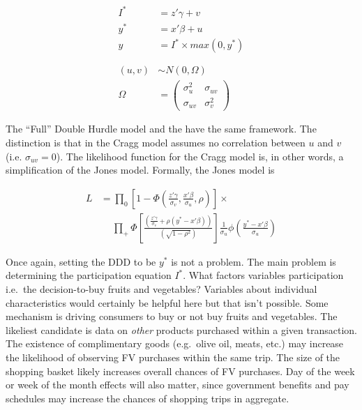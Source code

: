 \documentclass[12pt,letterpaperpaper,]{book}
\begin{document}
\[
\begin{aligned}
I^* &= z'\gamma + v \\
y^* &= x'\beta + u  \\
y   &= I^* \times max(0, y^*) \\
& \phantom{x}\\
(u,v) & \sim N(0,\Omega) \\
\Omega & = {\left (
\begin{array}{cc}
  \sigma^2_{u} & \sigma_{uv} \\
  \sigma_{uv} & \sigma^2_{v}
\end{array}
\right )}
\end{aligned}
\label{eq:dhurdle}
\]

The \citet{jones_double-hurdle_1989} ``Full'' Double Hurdle model and
the \citet{cragg_statistical_1971} have the same framework. The
distinction is that in the Cragg model assumes no correlation between
\(u\) and \(v\) (i.e. \(\sigma_{uv} = 0\)). The likelihood function for
the Cragg model is, in other words, a simplification of the Jones model.
Formally, the Jones model is

\[
\begin{aligned}
L &= \prod_0
  \left [
    1 - \Phi
    \left (
      \frac{z'\gamma}{\sigma_v},
      \frac{x'\beta}{\sigma_u},
      \rho
    \right )
  \right ] \times \\
& \quad ~ \prod_{+} \Phi
  \left [
      \frac{ \left (
        \frac{z'\gamma}{\sigma_v} +
        \rho(y^* - x'\beta) \right )}
         {\left ( \sqrt{1 - \rho^2} \right ) } \right ]
\frac{1}{\sigma_u} \phi \left ( \frac{y^* - x'\beta}{\sigma_u} \right )
\end{aligned}
\label{eq:lhurdle}
\]

Once again, setting the DDD to be \(y^*\) is not a problem. The main
problem is determining the participation equation \(I^*\). What factors
variables participation i.e.~the decision-to-buy fruits and vegetables?
Variables about individual characteristics would certainly be helpful
here but that isn't possible. Some mechanism is driving consumers to buy
or not buy fruits and vegetables. The likeliest candidate is data on
\emph{other} products purchased within a given transaction. The
existence of complimentary goods (e.g.~olive oil, meats, etc.) may
increase the likelihood of observing FV purchases within the same trip.
The size of the shopping basket likely increases overall chances of FV
purchases. Day of the week or week of the month effects will also
matter, since government benefits and pay schedules may increase the
chances of shopping trips in aggregate.
\end{document}
